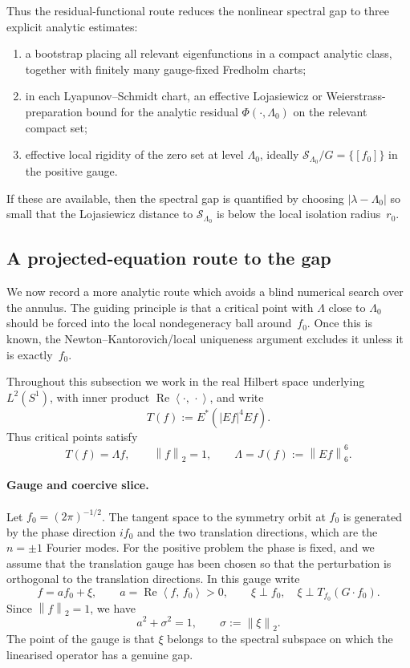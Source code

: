 \documentclass[12pt]{article}
\theoremstyle{definition}
\theoremstyle{remark}
\newcommand{\norm}[1]{\left\|#1\right\|}
\newcommand{\ip}[2]{\left\langle #1,\, #2\right\rangle}
\newcommand{\re}{\operatorname{Re}}
\begin{document}
Thus the residual-functional route reduces the nonlinear spectral gap to
three explicit analytic estimates:
\begin{enumerate}[leftmargin=2em]
  \item a bootstrap placing all relevant eigenfunctions in a compact
  analytic class, together with finitely many gauge-fixed Fredholm charts;
  \item in each Lyapunov--Schmidt chart, an effective Lojasiewicz or
  Weierstrass-preparation bound for the analytic residual
  $\Phi(\cdot,\Lambda_0)$ on the relevant compact set;
  \item effective local rigidity of the zero set at level $\Lambda_0$,
  ideally $\mathcal S_{\Lambda_0}/G=\{[f_0]\}$ in the positive gauge.
\end{enumerate}
If these are available, then the spectral gap is quantified by choosing
$|\lambda-\Lambda_0|$ so small that the Lojasiewicz distance to
$\mathcal S_{\Lambda_0}$ is below the local isolation radius~$r_0$.

\subsection{A projected-equation route to the gap}
\label{sec:projected-gap-route}

We now record a more analytic route which avoids a blind numerical search
over the annulus.  The guiding principle is that a critical point with
\(\Lambda\) close to \(\Lambda_0\) should be forced into the local
nondegeneracy ball around~\(f_0\).  Once this is known, the
Newton--Kantorovich/local uniqueness argument excludes it unless it is
exactly~\(f_0\).

Throughout this subsection we work in the real Hilbert space underlying
\(L^2(S^1)\), with inner product \(\re\ip{\cdot}{\cdot}\), and write
\[
  T(f):=E^*(|Ef|^4Ef).
\]
Thus critical points satisfy
\[
  T(f)=\Lambda f,\qquad \norm f_2=1,
  \qquad
  \Lambda=J(f):=\norm{Ef}_6^6.
\]

\paragraph{Gauge and coercive slice.}
Let \(f_0=(2\pi)^{-1/2}\).  The tangent space to the symmetry orbit at
\(f_0\) is generated by the phase direction \(if_0\) and the two
translation directions, which are the \(n=\pm1\) Fourier modes.  For the
positive problem the phase is fixed, and we assume that the translation
gauge has been chosen so that the perturbation is orthogonal to the
translation directions.  In this gauge write
\begin{equation}\label{eq:af0-xi-decomp}
  f=af_0+\xi,
  \qquad
  a=\re\ip{f}{f_0}>0,
  \qquad
  \xi\perp f_0,\quad \xi\perp T_{f_0}(G\cdot f_0).
\end{equation}
Since \(\norm f_2=1\), we have
\[
  a^2+\sigma^2=1,\qquad \sigma:=\norm{\xi}_2.
\]
The point of the gauge is that \(\xi\) belongs to the spectral subspace
on which the linearised operator has a genuine gap.
\end{document}
